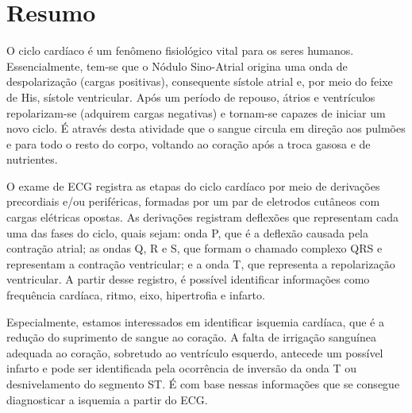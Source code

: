 \section{Resumo}
O ciclo cardíaco é um fenômeno fisiológico vital para os seres humanos. Essencialmente, tem-se que o Nódulo Sino-Atrial origina uma onda de despolarização (cargas positivas), consequente sístole atrial e, por meio do feixe de His, sístole ventricular. Após um período de repouso, átrios e ventrículos repolarizam-se (adquirem cargas negativas) e tornam-se capazes de iniciar um novo ciclo. É através desta atividade que o sangue circula em direção aos pulmões e para todo o resto do corpo, voltando ao coração após a troca gasosa e de nutrientes.

O exame de ECG registra as etapas do ciclo cardíaco por meio de derivações precordiais e/ou periféricas, formadas por um par de eletrodos cutâneos com cargas elétricas opostas. As derivações registram deflexões que representam cada uma das fases do ciclo, quais sejam: onda P, que é a deflexão causada pela contração atrial; as ondas Q, R e S, que formam o chamado complexo QRS e representam a contração ventricular; e a onda T, que representa a repolarização ventricular. A partir desse registro, é possível identificar informações como frequência cardíaca, ritmo, eixo, hipertrofia e infarto. 

Especialmente, estamos interessados em identificar isquemia cardíaca, que é a redução do suprimento de sangue ao coração. A falta de irrigação sanguínea adequada ao coração, sobretudo ao ventrículo esquerdo, antecede um possível infarto e pode ser identificada pela ocorrência de inversão da onda T ou desnivelamento do segmento ST. É com base nessas informações que se consegue diagnosticar a isquemia a partir do ECG.
